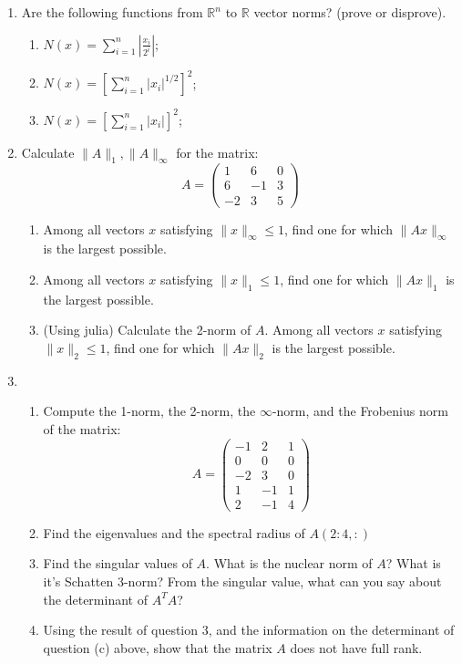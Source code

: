 \documentclass[11pt]{article}
\newcommand{\R}{\mathbb{R}}
\begin{document}
\begin{enumerate}
	\item Are the following functions from \(\R^n\) to \(\R\) vector norms? (prove or disprove).
	      \begin{multicols}{3}
		      \begin{enumerate}[label=(\alph*)]
			      \item \(N(x) = \displaystyle\sum_{i=1}^n \left| \frac{x_i}{2^i} \right|\);
			      \item \(N(x) = \left[ \displaystyle\sum_{i=1}^n |x_i|^{1/2} \right]^2\);
			      \item \(N(x) = \left[ \displaystyle\sum_{i=1}^n |x_i| \right]^2\);
		      \end{enumerate}
	      \end{multicols}

	\item Calculate \(\lVert A \rVert_1, \lVert A \rVert_\infty\) for the matrix:
	      \[A = \begin{pmatrix} 1 & 6 & 0 \\ 6 & -1 & 3 \\ -2 & 3 & 5 \end{pmatrix}\]
	      \begin{enumerate}[label=(\alph*)]
		      \item Among all vectors \(x\) satisfying \(\lVert x \rVert_\infty \leq 1\), find one for which \(\lVert Ax \rVert_\infty\) is the largest possible.
		      \item Among all vectors \(x\) satisfying \(\lVert x \rVert_1 \leq 1\), find one for which \(\lVert Ax \rVert_1\) is the largest possible.
		      \item (Using julia) Calculate the 2-norm of \(A\).  Among all vectors \(x\) satisfying \(\lVert x \rVert_2 \leq 1\), find one for which \(\lVert Ax \rVert_2\) is the largest possible.
	      \end{enumerate}

	\item \begin{enumerate}[label=(\alph*)]
		      \item Compute the 1-norm, the 2-norm, the \(\infty\)-norm, and the Frobenius norm of the matrix:
		            \[A = \begin{pmatrix} -1 & 2 & 1 \\ 0 & 0 & 0 \\ -2 & 3 & 0 \\ 1 & -1 & 1 \\ 2 & -1 & 4 \end{pmatrix}\]
		      \item Find the eigenvalues and the spectral radius of \(A(2:4,:)\)
		      \item Find the singular values of \(A\).  What is the nuclear norm of \(A\)?  What is it's Schatten 3-norm?  From the singular value, what can you say about the determinant of \(A^TA\)?
		      \item Using the result of question 3, and the information on the determinant of question (c) above, show that the matrix \(A\) does not have full rank.
	      \end{enumerate}
\end{enumerate}
\end{document}

